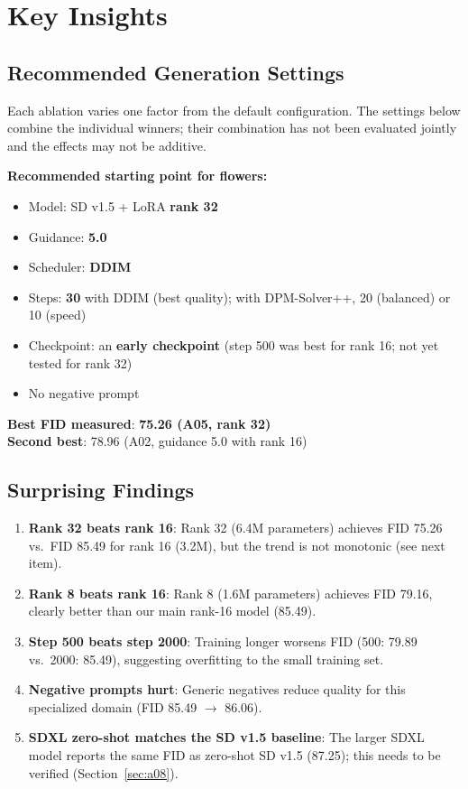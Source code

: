 \documentclass[11pt]{article}
\begin{document}
\section{Key Insights}

\subsection{Recommended Generation Settings}

Each ablation varies one factor from the default configuration. The settings below combine the individual winners; their combination has not been evaluated jointly and the effects may not be additive.

\textbf{Recommended starting point for flowers:}
\begin{itemize}
    \item Model: SD v1.5 + LoRA \textbf{rank 32}
    \item Guidance: \textbf{5.0}
    \item Scheduler: \textbf{DDIM}
    \item Steps: \textbf{30} with DDIM (best quality); with DPM-Solver++, 20 (balanced) or 10 (speed)
    \item Checkpoint: an \textbf{early checkpoint} (step 500 was best for rank 16; not yet tested for rank 32)
    \item No negative prompt
\end{itemize}

\textbf{Best FID measured}: \textbf{75.26 (A05, rank 32)}\\
\textbf{Second best}: 78.96 (A02, guidance 5.0 with rank 16)

\subsection{Surprising Findings}

\begin{enumerate}
    \item \textbf{Rank 32 beats rank 16}: Rank 32 (6.4M parameters) achieves FID 75.26 vs.\ FID 85.49 for rank 16 (3.2M), but the trend is not monotonic (see next item).
    \item \textbf{Rank 8 beats rank 16}: Rank 8 (1.6M parameters) achieves FID 79.16, clearly better than our main rank-16 model (85.49).
    \item \textbf{Step 500 beats step 2000}: Training longer worsens FID (500: 79.89 vs.\ 2000: 85.49), suggesting overfitting to the small training set.
    \item \textbf{Negative prompts hurt}: Generic negatives reduce quality for this specialized domain (FID 85.49 $\to$ 86.06).
    \item \textbf{SDXL zero-shot matches the SD v1.5 baseline}: The larger SDXL model reports the same FID as zero-shot SD v1.5 (87.25); this needs to be verified (Section~\ref{sec:a08}).
\end{enumerate}
\end{document}
